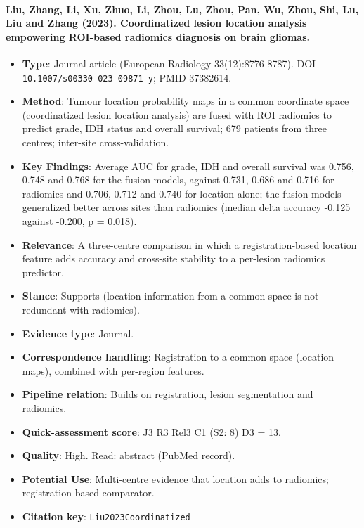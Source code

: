 \documentclass[journal,onecolumn]{IEEEtran}
\begin{document}
\paragraph{Liu, Zhang, Li, Xu, Zhuo, Li, Zhou, Lu, Zhou, Pan, Wu, Zhou, Shi, Lu, Liu and Zhang (2023). Coordinatized lesion location analysis empowering ROI-based radiomics diagnosis on brain gliomas.~\cite{Liu2023Coordinatized}}\mbox{}

\begin{itemize}

\item{} \textbf{Type}: Journal article (European Radiology 33(12):8776-8787). DOI \nolinkurl{10.1007/s00330-023-09871-y}; PMID 37382614.

\item{} \textbf{Method}: Tumour location probability maps in a common coordinate space (coordinatized lesion location analysis) are fused with ROI radiomics to predict grade, IDH status and overall survival; 679 patients from three centres; inter-site cross-validation.

\item{} \textbf{Key Findings}: Average AUC for grade, IDH and overall survival was 0.756, 0.748 and 0.768 for the fusion models, against 0.731, 0.686 and 0.716 for radiomics and 0.706, 0.712 and 0.740 for location alone; the fusion models generalized better across sites than radiomics (median delta accuracy -0.125 against -0.200, p = 0.018).

\item{} \textbf{Relevance}: A three-centre comparison in which a registration-based location feature adds accuracy and cross-site stability to a per-lesion radiomics predictor.

\item{} \textbf{Stance}: Supports (location information from a common space is not redundant with radiomics).

\item{} \textbf{Evidence type}: Journal.

\item{} \textbf{Correspondence handling}: Registration to a common space (location maps), combined with per-region features.

\item{} \textbf{Pipeline relation}: Builds on registration, lesion segmentation and radiomics.

\item{} \textbf{Quick-assessment score}: J3 R3 Rel3 C1 (S2: 8) D3 = 13.

\item{} \textbf{Quality}: High. Read: abstract (PubMed record).

\item{} \textbf{Potential Use}: Multi-centre evidence that location adds to radiomics; registration-based comparator.

\item{} \textbf{Citation key}: \texttt{Liu2023Coordinatized}

\end{itemize}
\end{document}
